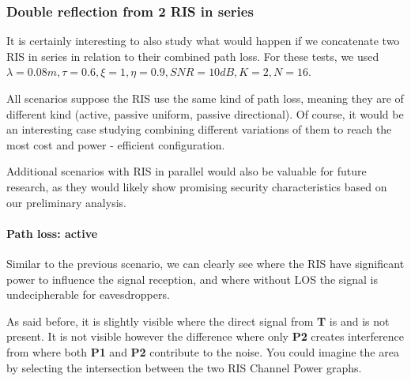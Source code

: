 \subsubsection{Double reflection from 2 RIS in series}

It is certainly interesting to also study what would happen if we concatenate two RIS in series in relation to their combined path loss. For these tests, we used $\lambda = 0.08m, \tau = 0.6, \xi = 1, \eta = 0.9, SNR = 10dB, K = 2, N = 16$.

All scenarios suppose the RIS use the same kind of path loss, meaning they are of different kind (active, passive uniform, passive directional). Of course, it would be an interesting case studying combining different variations of them to reach the most cost and power - efficient configuration.

Additional scenarios with RIS in parallel would also be valuable for future research, as they would likely show promising security characteristics based on our preliminary analysis.

\paragraph*{Path loss: active}
Similar to the previous scenario, we can clearly see where the RIS have significant power to influence the signal reception, and where without LOS the signal is undecipherable for eavesdroppers.

As said before, it is slightly visible where the direct signal from \textbf{T} is and is not present. It is not visible however the difference where only \textbf{P2} creates interference from where both \textbf{P1} and \textbf{P2} contribute to the noise. You could imagine the area by selecting the intersection between the two RIS Channel Power graphs.

